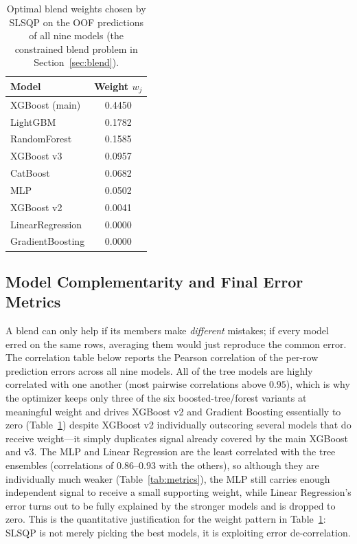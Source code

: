 \documentclass[journal]{IEEEtran}
\begin{document}
\begin{table}[!t]
\caption{Optimal blend weights chosen by SLSQP on the OOF predictions of all
nine models (the constrained blend problem in Section~\ref{sec:blend}).}
\label{tab:weights}
\centering
\begin{tabular}{lc}
\toprule
Model & Weight $w_j$ \\
\midrule
XGBoost (main) & 0.4450 \\
LightGBM & 0.1782 \\
RandomForest & 0.1585 \\
XGBoost v3 & 0.0957 \\
CatBoost & 0.0682 \\
MLP & 0.0502 \\
XGBoost v2 & 0.0041 \\
LinearRegression & 0.0000 \\
GradientBoosting & 0.0000 \\
\bottomrule
\end{tabular}
\end{table}

\subsection{Model Complementarity and Final Error Metrics}
\label{sec:complementarity}
A blend can only help if its members make \emph{different} mistakes; if every
model erred on the same rows, averaging them would just reproduce the common
error. The correlation table below reports the Pearson correlation of the per-row
prediction errors across all nine models. All of the tree models are highly
correlated with one another (most pairwise correlations above $0.95$), which is
why the optimizer keeps only three of the six boosted-tree/forest variants at
meaningful weight and drives XGBoost v2 and Gradient Boosting essentially to
zero (Table~\ref{tab:weights}) despite XGBoost v2 individually outscoring
several models that do receive weight---it simply duplicates signal already
covered by the main XGBoost and v3. The MLP and Linear Regression are the least
correlated with the tree ensembles (correlations of $0.86$--$0.93$ with the
others), so although they are individually much weaker
(Table~\ref{tab:metrics}), the MLP still carries enough independent signal to
receive a small supporting weight, while Linear Regression's error turns out to
be fully explained by the stronger models and is dropped to zero. This is the
quantitative justification for the weight pattern in Table~\ref{tab:weights}:
SLSQP is not merely picking the best models, it is exploiting error
de-correlation.
\end{document}

